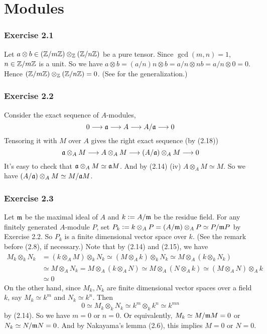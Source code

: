 \documentclass[../A&M.tex]{subfiles}
\begin{document}
\chapter{Modules}

\subsection*{Exercise 2.1}

Let $a \otimes b \in (\mathbb{Z}/m\mathbb{Z}) \otimes_{\mathbb{Z}} (\mathbb{Z}/n\mathbb{Z})$ be a pure tensor. Since $\gcd(m,n)=1$, $n\in \mathbb{Z}/m\mathbb{Z}$ is a unit. So we have $a \otimes b = (a/n)n \otimes b = a/n \otimes nb = a/n \otimes 0 = 0$. Hence $(\mathbb{Z}/m\mathbb{Z}) \otimes_{\mathbb{Z}} (\mathbb{Z}/n\mathbb{Z}) = 0$. (See  for the generalization.)

\subsection*{Exercise 2.2}

Consider the exact sequence of $A$-modules,
$$
0 \longrightarrow \mathfrak{a} \longrightarrow A \longrightarrow A/\mathfrak{a} \longrightarrow 0
$$
Tensoring it with $M$ over $A$ gives the right exact sequence (by (2.18))
$$
\mathfrak{a} \otimes_A M \longrightarrow A \otimes_A M \longrightarrow (A/\mathfrak{a}) \otimes_A M \longrightarrow 0
$$
It's easy to check that $\mathfrak{a} \otimes_A M \simeq \mathfrak{a} M$. And by (2.14) (iv) $A \otimes_A M \simeq M$. So we have $(A/\mathfrak{a}) \otimes_A M \simeq M/\mathfrak{a} M$.

\subsection*{Exercise 2.3}

Let $\mathfrak{m}$ be the maximal ideal of $A$ and $k:=A/\mathfrak{m}$ be the residue field. For any finitely generated $A$-module $P$, set $P_k := k \otimes_A P = (A/\mathfrak{m}) \otimes_A P \simeq P/\mathfrak{m} P$ by Exercise 2.2. So $P_k$ is a finite dimensional vector space over $k$. (See the remark before (2.8), if necessary.) Note that by (2.14) and (2.15), we have
\begin{align*}
	M_k \otimes_k N_k
	&= (k \otimes_A M) \otimes_k N_k
	\simeq (M \otimes_A k) \otimes_k N_k
	\simeq M \otimes_A (k \otimes_k N_k)     \\
	&\simeq M \otimes_A N_k
	= M \otimes_A (k \otimes_A N)
	\simeq M \otimes_A (N \otimes_A k)
	\simeq (M \otimes_A N) \otimes_A k    \\
	&\simeq 0	
\end{align*}
On the other hand, since $M_k,N_k$ are finite dimensional vector spaces over a field $k$, say $M_k \simeq k^m$ and $N_k\simeq k^n$. Then
$$
0 \simeq M_k \otimes_k N_k \simeq k^m \otimes_k k^n \simeq k^{mn}
$$
by (2.14). So we have $m=0$ or $n=0$. Or equivalently, $M_k \simeq M/\mathfrak{m} M = 0$ or $N_k \simeq N/\mathfrak{m} N = 0$. And by Nakayama's lemma (2.6), this implies $M=0$ or $N=0$.
\end{document}
